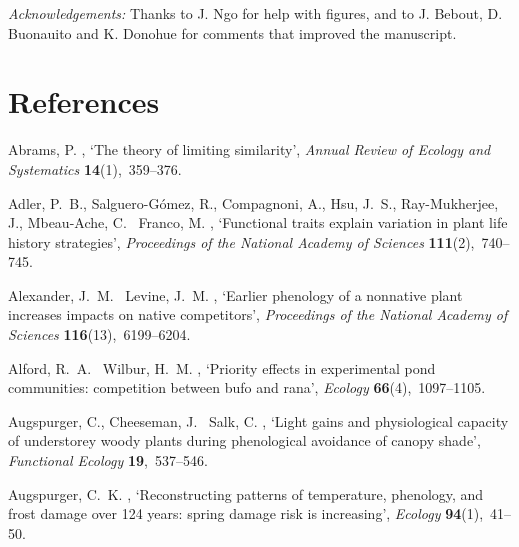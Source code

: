 \documentclass[11pt]{article}
\begin{document}
\emph{Acknowledgements:} Thanks to J. Ngo for help with figures, and to J. Bebout, D. Buonauito and K. Donohue for comments that improved the manuscript.

\newpage
\section{References}
\begin{thebibliography}{xx}

Abrams, P.  \harvardyearright , `The theory of limiting
  similarity', {\em Annual Review of Ecology and Systematics} {\bf
  14}(1),~359--376.

Adler, P.~B., Salguero-G{\'o}mez, R., Compagnoni, A., Hsu, J.~S.,
  Ray-Mukherjee, J., Mbeau-Ache, C. \harvardand\ Franco, M.  \harvardyearright , `Functional traits explain variation in plant life
  history strategies', {\em Proceedings of the National Academy of Sciences}
  {\bf 111}(2),~740--745.

Alexander, J.~M. \harvardand\ Levine, J.~M.  \harvardyearright , `Earlier phenology of a nonnative plant increases
  impacts on native competitors', {\em Proceedings of the National Academy of
  Sciences} {\bf 116}(13),~6199--6204.

Alford, R.~A. \harvardand\ Wilbur, H.~M.  \harvardyearright , `Priority effects in experimental pond communities:
  competition between bufo and rana', {\em Ecology} {\bf 66}(4),~1097--1105.

Augspurger, C., Cheeseman, J. \harvardand\ Salk, C.  \harvardyearleft
  2005\harvardyearright , `Light gains and physiological capacity of
  understorey woody plants during phenological avoidance of canopy shade', {\em
  Functional Ecology} {\bf 19},~537--546.

Augspurger, C.~K.  \harvardyearright , `Reconstructing
  patterns of temperature, phenology, and frost damage over 124 years: spring
  damage risk is increasing', {\em Ecology} {\bf 94}(1),~41--50.


\end{thebibliography}
\end{document}
